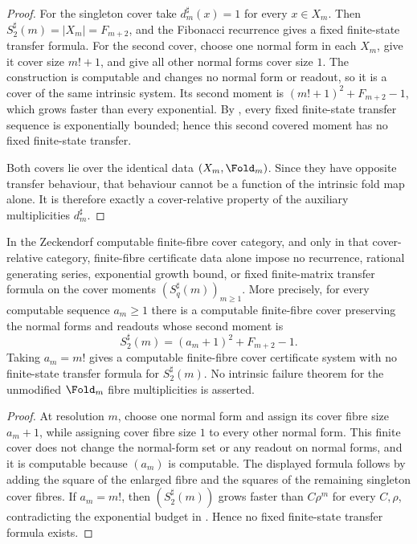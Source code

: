 \begin{proof}
For the singleton cover take \(d_m^\sharp(x)=1\) for every \(x\in X_m\).  Then
\(S_2^\sharp(m)=|X_m|=F_{m+2}\), and the Fibonacci recurrence gives a fixed
finite-state transfer formula.  For the second cover, choose one normal form in
each \(X_m\), give it cover size \(m!+1\), and give all other normal forms cover
size \(1\).  The construction is computable and changes no normal form or
readout, so it is a cover of the same intrinsic system.  Its second moment is
\((m!+1)^2+F_{m+2}-1\), which grows faster than every exponential.  By
, every fixed finite-state transfer
sequence is exponentially bounded; hence this second covered moment has no fixed
finite-state transfer.

Both covers lie over the identical data \((X_m,\Fold_m)\).  Since they have
opposite transfer behaviour, that behaviour cannot be a function of the
intrinsic fold map alone.  It is therefore exactly a cover-relative property of
the auxiliary multiplicities \(d_m^\sharp\).
\end{proof}
\begin{theorem}
\label{thm:L2-finite-fiber-no-transfer-content}
\label{thm:cover-relative-finite-fibre-no-transfer}
In the Zeckendorf computable finite-fibre cover category, and only in that
cover-relative category, finite-fibre certificate data alone impose no
recurrence, rational generating series, exponential growth bound, or fixed
finite-matrix transfer formula on the cover moments \((S_q^\sharp(m))_{m\ge1}\).
More precisely, for every computable sequence \(a_m\ge1\) there is a computable
finite-fibre cover preserving the normal forms and readouts whose second moment is
\[
  S_2^\sharp(m)=(a_m+1)^2+F_{m+2}-1 .
\]
Taking \(a_m=m!\) gives a computable finite-fibre cover certificate system with
no finite-state transfer formula for \(S_2^\sharp(m)\).  No intrinsic failure
theorem for the unmodified \(\Fold_m\) fibre multiplicities is asserted.
\end{theorem}

\begin{proof}
At resolution \(m\), choose one normal form and assign its cover fibre size
\(a_m+1\), while assigning cover fibre size \(1\) to every other normal form.
This finite cover does not change the normal-form set or any readout on normal
forms, and it is computable because \((a_m)\) is computable.  The displayed
formula follows by adding the square of the enlarged fibre and the squares of
the remaining singleton cover fibres.  If \(a_m=m!\), then
\((S_2^\sharp(m))\) grows faster than
\(C\rho^m\) for every \(C,
\rho\), contradicting the exponential budget in
.  Hence no fixed finite-state
transfer formula exists.
\end{proof}

